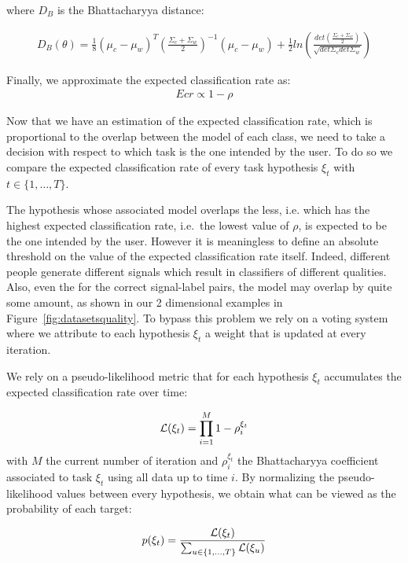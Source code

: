 where $D_B$ is the Bhattacharyya distance:

\begin{eqnarray}
D_B(\theta) = \frac{1}{8}(\mu_c-\mu_w)^T(\frac{\Sigma_c+\Sigma_w}{2})^{-1}(\mu_c-\mu_w)+\frac{1}{2}ln\left(\frac{det(\frac{\Sigma_c+\Sigma_w}{2})}{\sqrt{det\Sigma_c det\Sigma_w}}\right)
\end{eqnarray}

Finally, we approximate the expected classification rate as:
\begin{eqnarray}
Ecr \propto 1 - \rho
\end{eqnarray}

Now that we have an estimation of the expected classification rate, which is proportional to the overlap between the model of each class, we need to take a decision with respect to which task is the one intended by the user. To do so we compare the expected classification rate of every task hypothesis $\xi_t$ with $t \in \{1, \ldots, T\}$. 

The hypothesis whose associated model overlaps the less, i.e. which has the highest expected classification rate, i.e.\ the lowest value of $\rho$, is expected to be the one intended by the user. However it is meaningless to define an absolute threshold on the value of the expected classification rate itself. Indeed, different people generate different signals which result in classifiers of different qualities. Also, even the for the correct signal-label pairs, the model may overlap by quite some amount, as shown in our 2 dimensional examples in Figure~\ref{fig:datasetsquality}. To bypass this problem we rely on a voting system where we attribute to each hypothesis $\xi_t$ a weight that is updated at every iteration.

We rely on a pseudo-likelihood metric that for each hypothesis $\xi_t$ accumulates the expected classification rate over time:

\begin{eqnarray}
\mathcal{L}(\xi_t) = \prod_{i = 1}^{M} 1 - \rho_i^{\xi_t}
\end{eqnarray}
%
with $M$ the current number of iteration and $\rho_i^{\xi_t}$ the Bhattacharyya coefficient associated to task $\xi_t$ using all data up to time $i$. By normalizing the pseudo-likelihood values between every hypothesis, we obtain what can be viewed as the probability of each target:

\begin{eqnarray}
p(\xi_t) = \frac{\mathcal{L}(\xi_t)}{\sum_{u \in \{1, \ldots, T\}} \mathcal{L}(\xi_u)}
\end{eqnarray}

